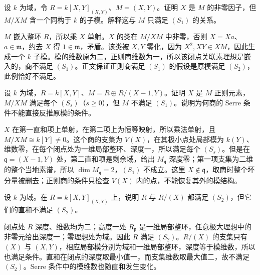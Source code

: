 \begin{exercise}\label{b3:ex:16-regular-section-embedded}
	设 \(k\) 为域，令 \(R=k[X,Y]_{(X,Y)}\)、\(M=(X,Y)\)。证明 \(X\) 是 \(M\) 的非零因子，但 \(M/XM\) 含一个同构于 \(k\) 的子模。解释这与 \(M\) 只满足 \((S_1)\) 的关系。
\end{exercise}
\begin{solution}
	\(M\) 嵌入整环 \(R\)，所以乘 \(X\) 单射。\(X\) 的类在 \(M/XM\) 中非零，否则 \(X=Xa\)、\(a\in\mathfrak m\)，约去 \(X\) 得 \(1\in\mathfrak m\)，矛盾。该类被 \(X,Y\) 零化，因为 \(X^2,XY\in XM\)，因此生成一个 \(k\) 子模。模的维数原为二，正则商维数为一，所以该闭点关联素理想是嵌入的，商不满足 \((S_1)\)。正文保证正则商满足 \((S_1)\) 的假设是原模满足 \((S_2)\)，此例恰好不满足。
\end{solution}

\begin{exercise}\label{b3:ex:16-sk-section-general}
	设 \(k\) 为域，\(R=k[X,Y]\)、\(M=R\oplus R/(X-1,Y)\)。证明 \(X\) 是 \(M\) 正则元素，\(M/XM\) 满足每个 \((S_s)\)（\(s\ge0\)），但 \(M\) 不满足 \((S_1)\)。说明为何商的 Serre 条件不能直接反推原模的条件。
\end{exercise}
\begin{solution}
	\(X\) 在第一直和项上单射，在第二项上为恒等映射，所以乘法单射，且 \(M/XM\cong k[Y]\ne0\)。这个商的支集为 \(V(X)\)，在其极小点处局部模为 \(k(Y)\)、维数零，在每个闭点处为一维局部整环、深度一，所以满足每个 \((S_s)\)。但是在 \(\mathfrak q=(X-1,Y)\) 处，第二直和项是剩余域，给出 \(M_{\mathfrak q}\) 深度零；第一项支集为二维的整个当地素谱，所以 \(\dim M_{\mathfrak q}=2\)，\((S_1)\) 不成立。这里 \(X\notin\mathfrak q\)，取商时整个坏分量被删去；正则商的条件只检查 \(V(X)\) 内的点，不能恢复其外的模结构。
\end{solution}

\begin{exercise}\label{b3:ex:16-sk-direct-sum-failure}
	设 \(k\) 为域。在 \(R=k[X,Y]_{(X,Y)}\) 上，说明 \(R\) 与 \(R/(X)\) 都满足 \((S_2)\)，但它们的直和不满足 \((S_2)\)。
\end{exercise}
\begin{solution}
	闭点处 \(R\) 深度、维数均为二；高度一处 \(R_{\mathfrak p}\) 是一维局部整环，任意极大理想中的非零元给出深度一；零理想处为域。因此 \(R\) 满足 \((S_2)\)。\(R/(X)\) 的支集只有 \((X)\) 与 \((X,Y)\)，相应局部模分别为域和一维局部整环，深度等于模维数，所以也满足条件。直和在闭点的深度取最小值一，而支集维数取最大值二，故不满足 \((S_2)\)。Serre 条件中的模维数也随直和发生变化。
\end{solution}
